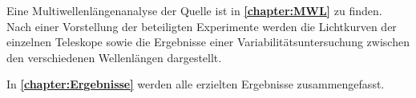 Eine Multiwellenlängenanalyse der Quelle ist in \textbf{\autoref{chapter:MWL}} zu finden.
Nach einer Vorstellung der beteiligten Experimente werden die Lichtkurven der einzelnen Teleskope sowie die Ergebnisse einer Variabilitätsuntersuchung zwischen den verschiedenen Wellenlängen  dargestellt.

In \textbf{\autoref{chapter:Ergebnisse}} werden alle erzielten Ergebnisse zusammengefasst.
